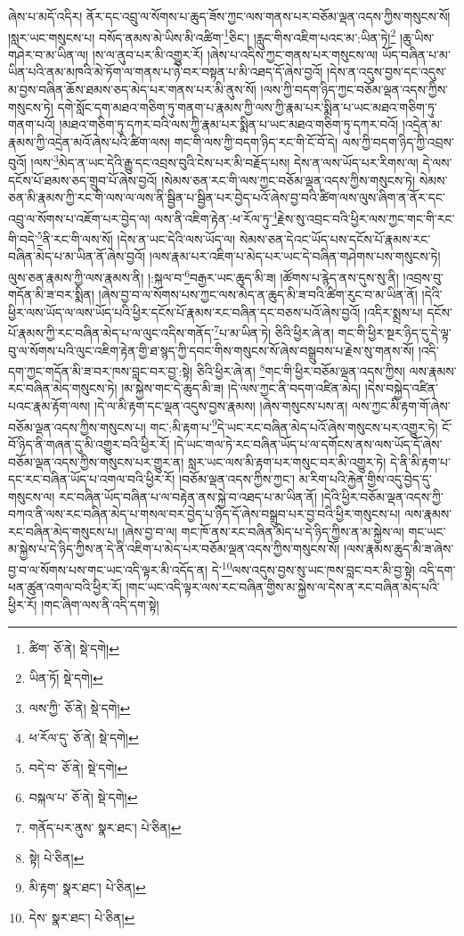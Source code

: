 ཞེས་པ་མདོ་འདིར། ནོར་དང་འབྲུ་ལ་སོགས་པ་ཆུད་ཟོས་ཀྱང་ལས་གནས་པར་བཅོམ་ལྡན་འདས་ཀྱིས་གསུངས་སོ། །སླར་ཡང་གསུངས་པ། བསོད་ནམས་མེ་ཡིས་མི་འཚིག་\footnote{ཚིག་  ཅོ་ནེ།  སྡེ་དགེ། }ཅིང་། །རླུང་གིས་འཇིག་པའང་མ་:ཡིན་ཏེ།\footnote{ཡིན་ཏོ།  སྡེ་དགེ། } །ཆུ་ཡིས་གཤེར་བ་མ་ཡིན་ལ། །ས་ལ་ནུབ་པར་མི་འགྱུར་རོ། །ཞེས་པ་འདིས་ཀྱང་གནས་པར་གསུངས་ལ། ཡོད་བཞིན་པ་མ་ཡིན་པའི་ནམ་མཁའི་མེ་ཏོག་ལ་གནས་པ་ཉེ་བར་བསྟན་པ་མི་འཐད་དོ་ཞེས་བྱའོ། །དེས་ན་འདུས་བྱས་དང་འདུས་མ་བྱས་བཞིན་ཆོས་ཐམས་ཅད་མེད་པར་གནས་པར་མི་ནུས་སོ། །ལས་ཀྱི་བདག་ཉིད་ཀྱང་བཅོམ་ལྡན་འདས་ཀྱིས་གསུངས་ཏེ། དགེ་སློང་དག་མཐའ་གཅིག་ཏུ་གནག་པ་རྣམས་ཀྱི་ལས་ཀྱི་རྣམ་པར་སྨིན་པ་ཡང་མཐའ་གཅིག་ཏུ་གནག་པའོ། །མཐའ་གཅིག་ཏུ་དཀར་བའི་ལས་ཀྱི་རྣམ་པར་སྨིན་པ་ཡང་མཐའ་གཅིག་ཏུ་དཀར་བའོ། །འདྲེན་མ་རྣམས་ཀྱི་འདྲེན་མའོ་ཞེས་པའི་ཚིག་ལས། གང་གི་ལས་ཀྱི་བདག་ཉིད་རང་གི་ངོ་བོ་དེ། ལས་ཀྱི་བདག་ཉིད་ཀྱི་འབྲས་བུའོ། །ལས་\footnote{ལས་ཀྱི་  ཅོ་ནེ།  སྡེ་དགེ། }མེད་ན་ཡང་དེའི་རྒྱུ་དང་འབྲས་བུའི་ངེས་པར་མི་བརྗོད་པས། དེས་ན་ལས་ཡོད་པར་རིགས་ལ། དེ་ལས་དངོས་པོ་ཐམས་ཅད་གྲུབ་པོ་ཞེས་བྱའོ། །སེམས་ཅན་རང་གི་ལས་ཀྱང་བཅོམ་ལྡན་འདས་ཀྱིས་གསུངས་ཏེ། སེམས་ཅན་མི་རྣམས་ཀྱི་རང་གི་ལས་ལ་ལས་ནི་སྦྱིན་པ་སྦྱིན་པར་བྱེད་པའོ་ཞེས་བྱ་བའི་ཚིག་ལས་ལུས་ཞིག་ན་ནོར་དང་འབྲུ་ལ་སོགས་པ་འཇོག་པར་བྱེད་ལ། ལས་ནི་འཇིག་རྟེན་:ཕ་རོལ་ཏུ་\footnote{ཕ་རོལ་དུ་  ཅོ་ནེ།  སྡེ་དགེ། }རྗེས་སུ་འབྲང་བའི་ཕྱིར་ལས་ཀྱང་གང་གི་རང་གི་བདེ་\footnote{བདེ་བ་  ཅོ་ནེ།  སྡེ་དགེ། }ནི་རང་གི་ལས་སོ། །དེས་ན་ཡང་དེའི་ལས་ཡོད་ལ། སེམས་ཅན་དེའང་ཡོད་པས་དངོས་པོ་རྣམས་རང་བཞིན་མེད་པ་མ་ཡིན་ནོ་ཞེས་བྱའོ། །ལས་རྣམ་པར་འཇིག་པ་མེད་པར་ཡང་དེ་བཞིན་གཤེགས་པས་གསུངས་ཏེ། ལུས་ཅན་རྣམས་ཀྱི་ལས་རྣམས་ནི། །:སྐལ་བ་\footnote{བསྐལ་པ་  ཅོ་ནེ།  སྡེ་དགེ། }བརྒྱར་ཡང་ཆུད་མི་ཟ། །ཚོགས་པ་རྙེད་ནས་དུས་སུ་ནི། །འབྲས་བུ་གདོན་མི་ཟ་བར་སྨིན། །ཞེས་བྱ་བ་ལ་སོགས་པས་ཀྱང་ལས་མེད་ན་ཆུད་མི་ཟ་བའི་ཚིག་རུང་བ་མ་ཡིན་ནོ། །དེའི་ཕྱིར་ལས་ཡོད་ལ་ལས་ཡོད་པའི་ཕྱིར་དངོས་པོ་རྣམས་རང་བཞིན་དང་བཅས་པའོ་ཞེས་བྱའོ། །འདིར་སྨྲས་པ། དངོས་པོ་རྣམས་ཀྱི་རང་བཞིན་མེད་པ་ལ་ལུང་འདིས་གནོད་\footnote{གནོད་པར་ནུས་  སྣར་ཐང་།  པེ་ཅིན། }པ་མ་ཡིན་ཏེ། ཅིའི་ཕྱིར་ཞེ་ན། གང་གི་ཕྱིར་སྔར་ཉིད་དུ་དེ་ལྟ་བུ་ལ་སོགས་པའི་ལུང་འཇིག་རྟེན་གྱི་ཐ་སྙད་ཀྱི་དབང་གིས་གསུངས་སོ་ཞེས་བསྒྲུབས་པ་རྗེས་སུ་གནས་སོ། །འདི་དག་ཀྱང་གདོན་མི་ཟ་བར་ཁས་བླང་བར་བྱ་:སྟེ། ཅིའི་ཕྱིར་ཞེ་ན། \footnote{སྟེ།    པེ་ཅིན། }གང་གི་ཕྱིར་བཅོམ་ལྡན་འདས་ཀྱིས། ལས་རྣམས་རང་བཞིན་མེད་གསུངས་ཏེ། །མ་སྐྱེས་གང་དེ་ཆུད་མི་ཟ། །དེ་ལས་ཀྱང་ནི་བདག་འཛིན་མེད། །དེས་བསྐྱེད་འཛིན་པའང་རྣམ་རྟོག་ལས། །དེ་ལ་མི་རྟག་དང་ལྡན་འདུས་བྱས་རྣམས། །ཞེས་གསུངས་པས་ན། ལས་ཀྱང་མི་རྟག་གོ་ཞེས་བཅོམ་ལྡན་འདས་ཀྱིས་གསུངས་པ། གང་:མི་རྟག་པ་\footnote{མི་རྟག་  སྣར་ཐང་།  པེ་ཅིན། }དེ་ཡང་རང་བཞིན་མེད་པའོ་ཞེས་གསུངས་པར་འགྱུར་ཏེ། ངོ་བོ་ཉིད་ནི་གཞན་དུ་མི་འགྱུར་བའི་ཕྱིར་རོ། །དེ་ཡང་གལ་ཏེ་རང་བཞིན་ཡོད་པ་ལ་དགོངས་ནས་ལས་ཡོད་དོ་ཞེས་བཅོམ་ལྡན་འདས་ཀྱིས་གསུངས་པར་གྱུར་ན། སླར་ཡང་ལས་མི་རྟག་པར་གསུང་བར་མི་འགྱུར་ཏེ། དེ་ནི་མི་རྟག་པ་དང་རང་བཞིན་ཡོད་པ་འགལ་བའི་ཕྱིར་རོ། །བཅོམ་ལྡན་འདས་ཀྱིས་ཀྱང་། མ་རིག་པའི་རྐྱེན་གྱིས་འདུ་བྱེད་དུ་གསུངས་ལ། རང་བཞིན་ཡོད་བཞིན་པ་ལ་བརྟེན་ནས་སྐྱེ་བ་འཐད་པ་མ་ཡིན་ནོ། །དེའི་ཕྱིར་བཅོམ་ལྡན་འདས་ཀྱི་བཀའ་ནི་ལས་རང་བཞིན་མེད་པ་གསལ་བར་བྱེད་པ་ཉིད་དོ་ཞེས་བསྒྲུབ་པར་བྱ་བའི་ཕྱིར་གསུངས་པ། ལས་རྣམས་རང་བཞིན་མེད་གསུངས་པ། །ཞེས་བྱ་བ་ལ། གང་ཁོ་ནས་རང་བཞིན་མེད་པ་དེ་ཉིད་ཀྱིས་ན་མ་སྐྱེས་ལ། གང་ཡང་མ་སྐྱེས་པ་དེ་ཉིད་ཀྱིས་ན་དེ་ནི་འཇིག་པ་མེད་པར་བཅོམ་ལྡན་འདས་ཀྱིས་གསུངས་སོ། །ལས་རྣམས་ཆུད་མི་ཟ་ཞེས་བྱ་བ་ལ་སོགས་པས་གང་ཡང་འདི་ལྟར་མི་འདོད་ན། དེ་\footnote{དེས་  སྣར་ཐང་།  པེ་ཅིན། }ལས་འདུས་བྱས་སུ་ཡང་ཁས་བླང་བར་མི་བྱ་སྟེ། འདི་དག་ཕན་ཚུན་འགལ་བའི་ཕྱིར་རོ། །གང་ཡང་འདི་ལྟར་ལས་རང་བཞིན་གྱིས་མ་སྐྱེས་ལ་དེས་ན་རང་བཞིན་མེད་པའི་ཕྱིར་རོ། །གང་ཞིག་ལས་ནི་འདི་དག་སྟེ། 